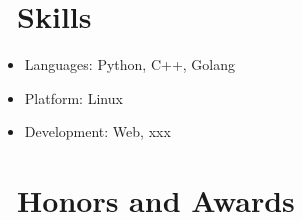 \documentclass{resume}
\begin{document}

\section{\faCogs\ Skills}
\begin{itemize}[parsep=0.5ex]
  \item Languages: Python, C++, Golang
  \item Platform: Linux
  \item Development: Web, xxx
\end{itemize}

\section{\faHeartO\ Honors and Awards}



%
%
\end{document}
